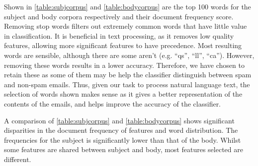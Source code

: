 \documentclass[10pt, a4paper]{article}
\begin{document}
Shown in \autoref{table:subjcorpus} and \autoref{table:bodycorpus} are the top 100 words for the subject and body corpora respectively and their document frequency score. Removing stop words filters out extremely common words that have little value in classification. It is beneficial in text processing, as it removes low quality features, allowing more significant features to have precedence. Most resulting words are sensible, although there are some aren't (e.g. ``qs'', ``ll'', ``ca''). However, removing these words results in a lower accuracy. Therefore, we have chosen to retain these as some of them may be help the classifier distinguish between spam and non-spam emails. Thus, given our task to process natural language text, the selection of words shown makes sense as it gives a better representation of the contents of the emails, and helps improve the accuracy of the classifier.

A comparison of \autoref{table:subjcorpus} and \autoref{table:bodycorpus} shows significant disparities in the document frequency of features and word distribution. The frequencies for the subject is significantly lower than that of the body. Whilst some features are shared between subject and body, most features selected are different.
\end{document}
